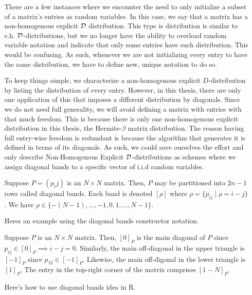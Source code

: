 
There are a few instances where we encounter the need to only initialize a subset of a matrix's entries as random variables. In this case, we say that a matrix has a non-homogenous explicit $\mathcal{D}$ distribution.
This type is distribution is similar to e.h. $\mathcal{D}$-distributions, but we no longer have the ability to overload random variable notation and indicate that only some entries have such distribution. This would be
confusing. As such, whenever we are not initializing every entry to have the same distribution, we have to define new, unique notation to do so.

To keep things simple, we characterize a non-homogenous explicit $D$-distribution by listing the distribution of every entry. However, in this thesis, there are only one application of this that imposes a different
distribution by diagonals. Since we do not need full generality, we will avoid defining a matrix with entries with that much freedom. This is because there is only one non-homogenous explicit distribution in this thesis,
the Hermite-$\beta$ matrix distribution. The reason having full entry-wise freedom is redundant is because the algorithm that generates it is defined in terms of its diagonals. As such, we could save ourselves the effort
and only describe Non-Homogenous Explicit $\mathcal{D}$-distributions as schemes where we assign diagonal bands to a specific vector of i.i.d random variables.


\begin{definition}
Suppose $P = (p_ij)$ is an $N \times N$ matrix. Then, $P$ may be partitioned into $2n - 1$ rows called diagonal bands. Each band is denoted $[\rho]$ where $\rho = \{p_{ij} \mid \rho = i - j\}$. We have
$\rho \in \{ -(N-1), \dots, -1, 0, 1, \dots, N-1 \}$.
\end{definition}

Heres an example using the diagonal bands constructor notation.

\begin{example}
Suppose $P$ is an $N \times N$ matrix. Then, $[0]_P$ is the main diagonal of $P$ since $p_{ij} \in [0]_P \implies i - j = 0$.
Similarly, the main off-diagonal in the upper triangle is $[-1]_P$ since $p_{12} \in [-1]_P$.
Likewise, the main off-digonal in the lower triangle is $[1]_P$. The entry in the top-right corner of the matrix comprises $[1 - N]_P$.
\end{example}

\begin{code}
Here's how to use diagonal bands idea in R.
\end{code}

